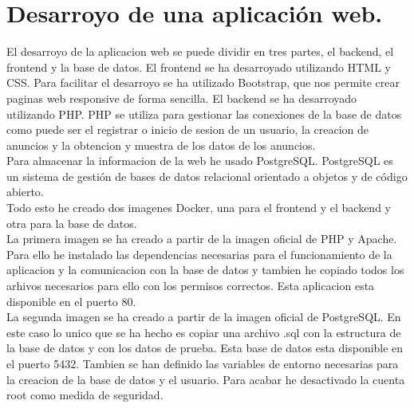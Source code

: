\documentclass{report}
\begin{document}
        \section{Desarroyo de una aplicación web.}
            El desarroyo de la aplicacion web se puede dividir en tres partes, el backend, el frontend y la base de datos.
            El frontend se ha desarroyado utilizando HTML y CSS.
            Para facilitar el desarroyo se ha utilizado Bootstrap, que nos permite crear paginas web responsive de forma sencilla.
            El backend se ha desarroyado utilizando PHP.
            PHP se utiliza para gestionar las conexiones de la base de datos como puede ser el registrar o inicio de sesion de un usuario, la creacion de anuncios y la obtencion y muestra de los datos de los anuncios.\\
            Para almacenar la informacion de la web he usado PostgreSQL.
            PostgreSQL es un sistema de gestión de bases de datos relacional orientado a objetos y de código abierto.\\

            Todo esto he creado dos imagenes Docker, una para el frontend y el backend y otra para la base de datos.\\

            La primera imagen se ha creado a partir de la imagen oficial de PHP y Apache.
            Para ello he instalado las dependencias necesarias para el funcionamiento de la aplicacion y la comunicacion con la base de datos y tambien he copiado todos los arhivos necesarios para ello con los permisos correctos.
            Esta aplicacion esta disponible en el puerto 80.\\

            La segunda imagen se ha creado a partir de la imagen oficial de PostgreSQL.
            En este caso lo unico que se ha hecho es copiar una archivo .sql con la estructura de la base de datos y con los datos de prueba.
            Esta base de datos esta disponible en el puerto 5432.
            Tambien se han definido las variables de entorno necesarias para la creacion de la base de datos y el usuario.
            Para acabar he desactivado la cuenta root como medida de seguridad.\\

        \clearpage
\end{document}
